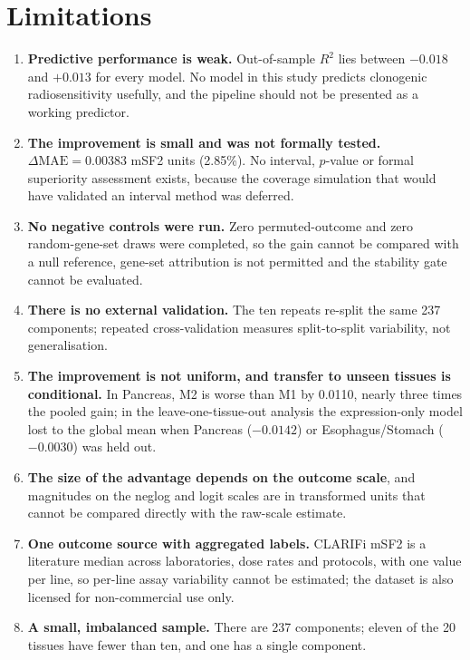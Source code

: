 \chapter{Limitations}\label{ch:limitations}

\begin{enumerate}
  \item \textbf{Predictive performance is weak.} Out-of-sample $R^2$ lies between $-0.018$ and
    $+0.013$ for every model. No model in this study predicts clonogenic radiosensitivity
    usefully, and the pipeline should not be presented as a working predictor.
  \item \textbf{The improvement is small and was not formally tested.} $\Delta\mathrm{MAE}=
    0.00383$ mSF2 units (2.85\%). No interval, $p$-value or formal superiority assessment
    exists, because the coverage simulation that would have validated an interval method was
    deferred.
  \item \textbf{No negative controls were run.} Zero permuted-outcome and zero random-gene-set
    draws were completed, so the gain cannot be compared with a null reference, gene-set
    attribution is not permitted and the stability gate cannot be evaluated.
  \item \textbf{There is no external validation.} The ten repeats re-split the same 237
    components; repeated cross-validation measures split-to-split variability, not
    generalisation.
  \item \textbf{The improvement is not uniform, and transfer to unseen tissues is
    conditional.} In Pancreas, M2 is worse than M1 by 0.0110, nearly three times the pooled
    gain; in the leave-one-tissue-out analysis the expression-only model lost to the global
    mean when Pancreas ($-0.0142$) or Esophagus/Stomach ($-0.0030$) was held out.
  \item \textbf{The size of the advantage depends on the outcome scale}, and magnitudes on
    the neglog and logit scales are in transformed units that cannot be compared directly
    with the raw-scale estimate.
  \item \textbf{One outcome source with aggregated labels.} CLARIFi mSF2 is a literature
    median across laboratories, dose rates and protocols, with one value per line, so per-line
    assay variability cannot be estimated; the dataset is also licensed for non-commercial use
    only.
  \item \textbf{A small, imbalanced sample.} There are 237 components; eleven of the 20
    tissues have fewer than ten, and one has a single component.

\end{enumerate}
